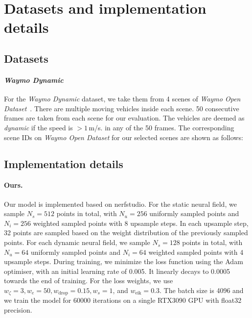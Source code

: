 \section{Datasets and implementation details}\label{sec:sup_dataset}
\subsection{Datasets}
\paragraph{\textit{Waymo Dynamic}} For the \textit{Waymo Dynamic} dataset, we take them from 4 scenes of \textit{Waymo Open Dataset}~\cite{sun2020scalability}. There are multiple moving vehicles inside each scene. 50 consecutive frames are taken from each scene for our evaluation. The vehicles are deemed as \textit{dynamic} if the speed is $>1\,$m/s. in any of the 50 frames. The corresponding scene IDs on \textit{Waymo Open Dataset} for our selected scenes are shown as follows:
\begin{table}[!h]
    \setlength{\tabcolsep}{4pt}
    \renewcommand{\arraystretch}{1.2}
	\centering
\end{table}

\subsection{Implementation details}
\paragraph{Ours.} 
Our model is implemented based on nerfstudio\cite{nerfstudio}. For the static neural field, we sample $N_s=512$ points in total, with $N_u=256$ uniformly sampled points and $N_i=256$ weighted sampled points with 8 upsample steps. In each upsample step, 32 points are sampled based on the weight distribution of the previously sampled points. For each dynamic neural field, we sample $N_s=128$ points in total, with $N_u=64$ uniformly sampled points and $N_i=64$ weighted sampled points with 4 upsample steps. During training, we minimize the loss function using the Adam~\cite{kingma2014adam} optimiser, with an initial learning rate of 0.005. It linearly decays to 0.0005 towards the end of training. For the loss weights, we use $w_{\zeta}=3, w_{e}=50, w_{\text{drop}}=0.15, w_{s}=1$, and  $w_{\text{eik}}=0.3$. The batch size is 4096 and we train the model for 60000 iterations on a single RTX3090 GPU with float32 precision.

